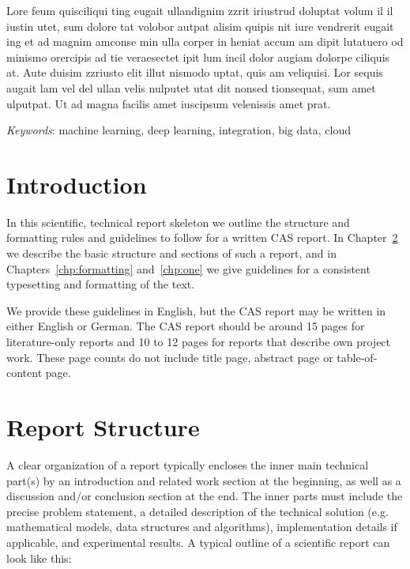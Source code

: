 \documentclass[11pt, a4paper,oneside,chapterprefix=false]{scrbook}
\begin{document}
Lore feum quisciliqui ting eugait ullandignim zzrit iriustrud doluptat volum il il iustin utet, sum dolore tat volobor autpat alisim quipis nit iure vendrerit eugait ing et ad magnim amconse min ulla corper in heniat accum am dipit lutatuero od minismo orercipis ad tie veraesectet ipit lum incil dolor augiam dolorpe ciliquis at. Aute duisim zzriusto elit illut nismodo uptat, quis am veliquisi. Lor sequis augait lam vel del ullan velis nulputet utat dit nonsed tionsequat, sum amet ulputpat. Ut ad magna facilis amet iuscipsum velenissis amet prat.

{\em Keywords}: machine learning, deep learning, integration, big data, cloud

\tableofcontents

\mainmatter


\chapter{Introduction} \label{chp:introduction}

In this scientific, technical report skeleton we outline the structure and formatting rules and guidelines to follow for a written CAS report. In Chapter~\ref{chp:structure} we describe the basic structure and sections of such a report, and in Chapters~\ref{chp:formatting} and~\ref{chp:one} we give guidelines for a consistent typesetting and formatting of the text.

We provide these guidelines in English, but the CAS report may be written in either English or German. The CAS report should be around 15 pages for literature-only reports and 10 to 12 pages for reports that describe own project work. These page counts do not include title page, abstract page or table-of-content page.


\chapter{Report Structure} \label{chp:structure}

A clear organization of a report typically encloses the inner main technical part(s) by an introduction and related work section at the beginning, as well as a discussion and/or conclusion section at the end. The inner parts must include the precise problem statement, a detailed description of the technical solution (e.g. mathematical models, data structures and algorithms), implementation details if applicable, and experimental results. A typical outline of a scientific report can look like this:
\end{document}
